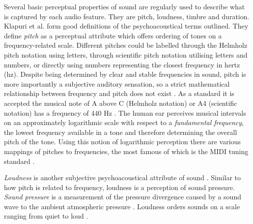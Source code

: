 Several basic perceptual properties of sound are regularly used to describe what
is captured by each audio feature. They are pitch, loudness, timbre and
duration. Klapuri et al. \cite{klapuri2007signal} form good definitions of the
psychoacoustical terms outlined. They define \textit{pitch} as a perceptual
attribute which offers ordering of tones on a frequency-related scale. Different
pitches could be labelled through the Helmholz pitch notation
\cite{helmholtz2013sensations} using letters, through scientific pitch notation
\cite{fletcher1934loudness} utilising letters and numbers, or directly using
numbers representing the closest frequency in hertz (hz). Despite being
determined by clear and stable frequencies in sound, pitch is more importantly a
subjective auditory sensation, so a strict mathematical relationship between
frequency and pitch does not exist \cite{acoustical1986american}. As a standard
it is accepted the musical note of A above C (Helmholz notation) or A4
(scientific notation) has a frequency of 440 Hz \cite{young1939terminology}. The
human ear perceives musical intervals on an approximately logarithmic scale with
respect to a \textit{fundamental frequency}, the lowest frequency available in a
tone and therefore determining the overall pitch of the tone. Using this notion
of logarithmic perception there are various mappings of pitches to frequencies,
the most famous of which is the MIDI tuning standard \cite{mts}.

\textit{Loudness} is another subjective psychoacoustical attribute of sound
\cite{klapuri2007signal}. Similar to how pitch is related to frequency, loudness
is a perception of sound pressure. \textit{Sound pressure} is a measurement of
the pressure divergence caused by a sound wave to the ambient atmospheric
pressure \cite{sound-pressure}. Loudness orders sounds on a scale ranging from
quiet to loud \cite{acoustical1986american}.

